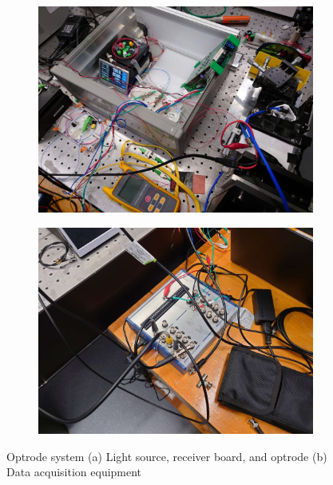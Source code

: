 \begin{figure}
\centering
\begin{subfigure}{.5\textwidth}
  \centering
  \includegraphics[width=0.9\linewidth]{4-ANC_Sys/OptrodeSys.jpg}
  \caption{}
  \label{fig_OptrodeSysPartial}
\end{subfigure}%
\begin{subfigure}{.5\textwidth}
  \centering
  \includegraphics[width=0.9\linewidth]{4-ANC_Sys/DAQ.jpg}
  \caption{}
  \label{fig_DAQ}
\end{subfigure}
\caption{Optrode system (a) Light source, receiver board, and optrode (b) Data acquisition equipment}
\label{fig_OptrodeSys}
\end{figure}


